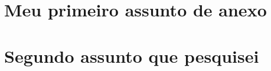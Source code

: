 \documentclass[
	10pt,				%
	openright,			%
	twoside,			%
	a4paper,			%
	chapter=TITLE,		%
	english,			%
	brazil				%
	]{abntex2}
\begin{document}
\begin{anexosenv}
\partanexos

\chapter{Meu primeiro assunto de anexo}
\lipsum[30]


\chapter{Segundo assunto que pesquisei}
\lipsum[31]

\end{anexosenv}

\printindex
\end{document}
